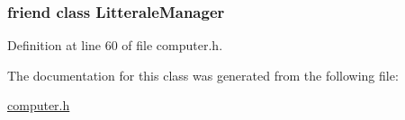 \subsubsection[{\texorpdfstring{Litterale\+Manager}{LitteraleManager}}]{\setlength{\rightskip}{0pt plus 5cm}friend class {\bf Litterale\+Manager}\hspace{0.3cm}{\ttfamily [friend]}}\hypertarget{class_litterale_manager_1_1const__iterator_a0aab3199db1ebeb99e33e66b9cf8e975}{}\label{class_litterale_manager_1_1const__iterator_a0aab3199db1ebeb99e33e66b9cf8e975}


Definition at line 60 of file computer.\+h.



The documentation for this class was generated from the following file\+:\begin{DoxyCompactItemize}
\item 
\hyperlink{computer_8h}{computer.\+h}\end{DoxyCompactItemize}
